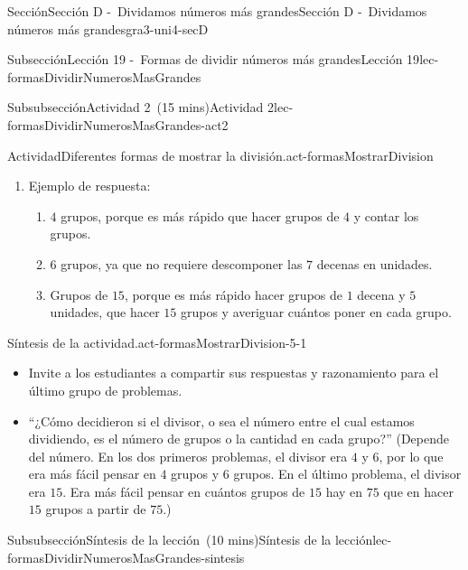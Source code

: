 \documentclass[oneside,10pt,]{article}
\begin{document}
\begin{sectionptx}{Sección}{Sección D -~Dividamos números más grandes}{}{Sección D -~Dividamos números más grandes}{}{}{gra3-uni4-secD}
\begin{subsectionptx}{Subsección}{Lección 19 -~Formas de dividir números más grandes}{}{Lección 19}{}{}{lec-formasDividirNumerosMasGrandes}
\begin{subsubsectionptx}{Subsubsección}{Actividad 2~(15 mins)}{}{Actividad 2}{}{}{lec-formasDividirNumerosMasGrandes-act2}
\begin{activity}{Actividad}{Diferentes formas de mostrar la división.}{act-formasMostrarDivision}
\begin{enumerate}
\begin{enumerate}
\item{}Jada hizo \(5\) grupos y puso \(1\) decena en cada uno. Descompuso la última decena en \(10\) unidades y puso \(2\) unidades en cada grupo. Han dividió cada decena en \(2\) grupos con \(5\) unidades en cada uno.%
\item{}En el trabajo de Jada, es el número en cada grupo, que es \(12\). En el trabajo de Han, es el número de grupos, que es \(12\).%
\end{enumerate}
\item{}Ejemplo de respuesta:%
%
\begin{enumerate}
\item{}\(4\) grupos, porque es más rápido que hacer grupos de \(4\) y contar los grupos.%
\item{}\(6\) grupos, ya que no requiere descomponer las \(7\) decenas en unidades.%
\item{}Grupos de \(15\), porque es más rápido hacer grupos de \(1\) decena y \(5\) unidades, que hacer \(15\) grupos y averiguar cuántos poner en cada grupo.%
\end{enumerate}
\end{enumerate}
\end{activity}%
\par
\begin{paragraphs}{Síntesis de la actividad.}{act-formasMostrarDivision-5-1}%
%
\begin{itemize}[label=\textbullet]
\item{}Invite a los estudiantes a compartir sus respuestas y razonamiento para el último grupo de problemas.%
\item{}``¿Cómo decidieron si el divisor, o sea el número entre el cual estamos dividiendo, es el número de grupos o la cantidad en cada grupo?'' (Depende del número. En los dos primeros problemas, el divisor era \(4\) y \(6\), por lo que era más fácil pensar en \(4\) grupos y \(6\) grupos. En el último problema, el divisor era \(15\). Era más fácil pensar en cuántos grupos de \(15\) hay en \(75\) que en hacer \(15\) grupos a partir de \(75\).)%
\end{itemize}
\end{paragraphs}%
\end{subsubsectionptx}
%
%
\typeout{************************************************}
\typeout{************************************************}
%
\begin{subsubsectionptx}{Subsubsección}{Síntesis de la lección~(10 mins)}{}{Síntesis de la lección}{}{}{lec-formasDividirNumerosMasGrandes-sintesis}

\end{subsubsectionptx}
\end{subsectionptx}
\end{sectionptx}
\end{document}
